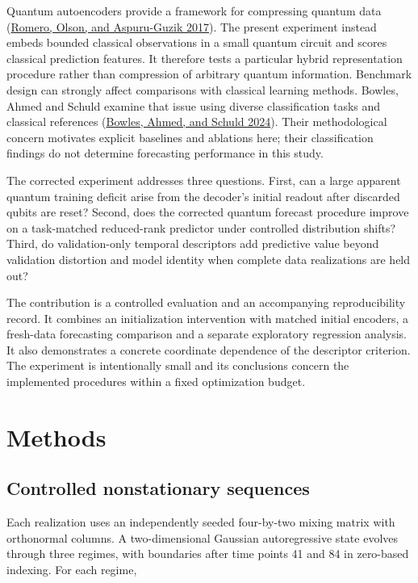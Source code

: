 \documentclass[
  11pt,
]{article}
\begin{document}
Quantum autoencoders provide a framework for compressing quantum data
(\protect\hyperlink{ref-romero2017autoencoders}{Romero, Olson, and
Aspuru-Guzik 2017}). The present experiment instead embeds bounded
classical observations in a small quantum circuit and scores classical
prediction features. It therefore tests a particular hybrid
representation procedure rather than compression of arbitrary quantum
information. Benchmark design can strongly affect comparisons with
classical learning methods. Bowles, Ahmed and Schuld examine that issue
using diverse classification tasks and classical references
(\protect\hyperlink{ref-bowles2024benchmarking}{Bowles, Ahmed, and
Schuld 2024}). Their methodological concern motivates explicit baselines
and ablations here; their classification findings do not determine
forecasting performance in this study.

The corrected experiment addresses three questions. First, can a large
apparent quantum training deficit arise from the decoder's initial
readout after discarded qubits are reset? Second, does the corrected
quantum forecast procedure improve on a task-matched reduced-rank
predictor under controlled distribution shifts? Third, do
validation-only temporal descriptors add predictive value beyond
validation distortion and model identity when complete data realizations
are held out?

The contribution is a controlled evaluation and an accompanying
reproducibility record. It combines an initialization intervention with
matched initial encoders, a fresh-data forecasting comparison and a
separate exploratory regression analysis. It also demonstrates a
concrete coordinate dependence of the descriptor criterion. The
experiment is intentionally small and its conclusions concern the
implemented procedures within a fixed optimization budget.

\hypertarget{methods}{%
\section{Methods}\label{methods}}

\hypertarget{controlled-nonstationary-sequences}{%
\subsection{Controlled nonstationary
sequences}\label{controlled-nonstationary-sequences}}

Each realization uses an independently seeded four-by-two mixing matrix
with orthonormal columns. A two-dimensional Gaussian autoregressive
state evolves through three regimes, with boundaries after time points
41 and 84 in zero-based indexing. For each regime,
\end{document}
